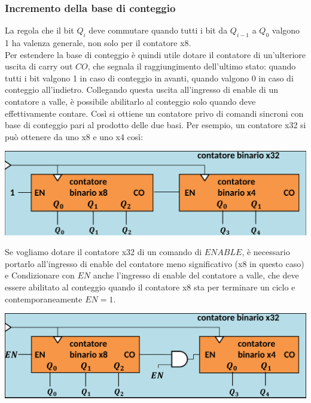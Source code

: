 \documentclass{article}
\begin{document}
\subsubsection{Incremento della base di conteggio}
La regola che il bit $Q_i$ deve commutare quando tutti i bit da $Q_{i-1}$ a $Q_0$ valgono 1 ha valenza generale, non solo per il contatore x8.\\
Per estendere la base di conteggio è quindi utile dotare il contatore di un’ulteriore uscita di carry out $CO$, che segnala il raggiungimento dell’ultimo stato: quando tutti i bit valgono 1 in caso di conteggio in avanti, quando valgono 0 in caso di conteggio all’indietro.
Collegando questa uscita all’ingresso di enable di un contatore a valle, è possibile abilitarlo al conteggio solo quando deve effettivamente contare. Così si ottiene un contatore privo di comandi sincroni con base di conteggio pari al prodotto delle due basi. Per esempio, un contatore x32 si può ottenere da uno x8 e uno x4 così:
\begin{center}
    \includegraphics[scale=0.35]{contatore x32.png}
\end{center}
Se vogliamo dotare il contatore x32 di un comando di $ENABLE$, è necessario portarlo all’ingresso di enable del contatore meno significativo (x8 in questo caso) e Condizionare con $EN$ anche l’ingresso di enable del contatore a valle, che deve essere abilitato al conteggio quando il contatore x8 sta per terminare un ciclo e contemporaneamente $EN=1$.
\begin{center}
    \includegraphics[scale=0.35]{contatore x32 en.png}
\end{center}
\end{document}
